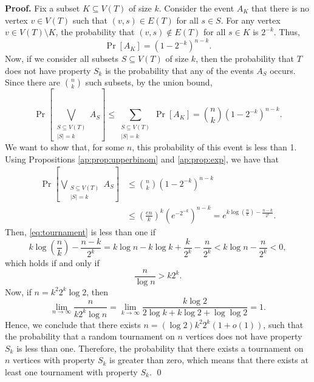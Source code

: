 \textbf{Proof. } Fix a subset $K \subseteq V(T)$ of size $k$. Consider the event $A_K$ that there is no vertex $v \in V(T)$ such that $(v, s) \in E(T)$ for all $s \in S$. For any vertex $v \in V(T) \setminus K$, the probability that $(v, s) \notin E(T)$ for all $s \in K$ is $2^{-k}$. Thus,
\[\Pr[A_K] = \left(1 - 2^{-k}\right)^{n - k}.\]
Now, if we consider all subsets $S \subseteq V(T)$ of size $k$, then the probability that $T$ does not have property $S_k$ is the probability that any of the events $A_S$ occurs. Since there are $\binom{n}{k}$ such subsets, by the union bound,
\[\Pr\left[\bigvee_{\substack{S \subseteq V(T) \\ |S| = k}} A_S\right] \leq \sum_{\substack{S \subseteq V(T) \\ |S| = k}}\Pr[A_K] = \binom{n}{k}\left(1 - 2^{-k}\right)^{n - k}.\]
We want to show that, for some $n$, this probability of this event is less than 1. Using Propositions \ref{ap:prop:upperbinom} and \ref{ap:prop:exp}, we have that
\begin{align}
    \Pr\left[\bigvee_{\substack{S \subseteq V(T) \\ |S| = k}} A_S\right] &\leq \binom{n}{k}\left(1 - 2^{-k}\right)^{n - k} \\
    &\leq \left(\frac{en}{k}\right)^k\left(e^{-2^{-k}}\right)^{n - k} = e^{k\log\left(\frac{n}{k}\right) - \frac{n - k}{2^k}}. \label{eq:tournament}
\end{align}
Then, \ref{eq:tournament} is less than one if 
\[k\log\left(\frac{n}{k}\right) - \frac{n - k}{2^k} = k\log n - k\log k + \frac{k}{2^k} - \frac{n}{2^k} < k\log n - \frac{n}{2^k} < 0,\]
which holds if and only if
\[\frac{n}{\log n} > k2^k.\]
Now, if $n = k^2 2^k\log 2$, then
\[\lim_{n \to \infty} \frac{n}{k2^k\log n} = \lim_{k \to \infty} \frac{k\log 2}{2\log k + k\log 2 + \log\log 2} = 1.\]
Hence, we conclude that there exists $n = (\log 2)k^2 2^k (1 + o(1))$, such that the probability that a random tournament on $n$ vertices does not have property $S_k$ is less than one. Therefore, the probability that there exists a tournament on $n$ vertices with property $S_k$ is greater than zero, which means that there exists at least one tournament with property $S_k$. \qed


